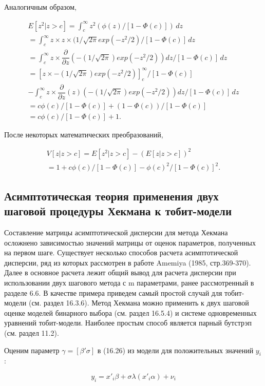 Аналогичным образом, 

\begin{multline}
E[z^2|z>c]=\int_c^{\infty}z^2(\phi(z)/[1-\Phi(c)])\,dz \\
=\int_c^{\infty} z{\times}z \times (1/\sqrt{2\pi}exp(-z^2/2)/[1-\Phi(c)]\,dz \\
=\int_c^{\infty}z{\times}\dfrac{\partial}{\partial{z}}\left(-(1/\sqrt{2\pi})exp(-z^2/2)\right)dz/[1-\Phi(c)]\,dz \\
=\left[z{\times}-(1/\sqrt{2\pi})exp(-z^2/2)\right]_c^{\infty}/[1-\Phi(c)] \\
-\int_c^{\infty}z{\times}\dfrac{\partial}{\partial{z}}(z)\left(-(1/\sqrt{2\pi})exp(-z^2/2)\right)dz/[1-\Phi(c)]\,dz\\
=c\phi(c)/[1-\Phi(c)]+(1-\Phi(c))/[1-\Phi(c)] \\
=c\phi(c)/[1-\Phi(c)]+1.
\end{multline}

После некоторых математических преобразований, 


\begin{align}
V[z|z>c]=E[z^2|z>c]-(E[z|z>c])^2 \\
=1+c\phi(c)/[1-\Phi(c)]-\phi(c)^2/[1-\Phi(c)]^{2}.
\end{align}



\subsection{Асимптотическая теория применения двух шаговой процедуры Хекмана к тобит-модели}

Составление матрицы асимптотической дисперсии для метода Хекмана осложнено зависимостью значений матрицы от оценок параметров, полученных на первом шаге. Существует несколько способов расчета асимптотической дисперсии, ряд из которых рассмотрен в работе Amemiya (1985, стр.369-370). Далее в основное расчета лежит общий вывод для расчета дисперсии при использовании двух шагового метода с m параметрами, ранее рассмотренный в разделе 6.6. В качестве примера приведем самый простой случай для тобит-модели (см. раздел 16.3.6). Метод Хекмана можно применить к двух шаговой оценке моделей бинарного выбора (см. раздел 16.5.4) и системе одновременных уравнений тобит-модели. Наиболее простым способ является парный бутстрэп (см. раздел 11.2).

Оценим параметр $\gamma=[\beta'\sigma]$ в (16.26) из модели для положительных значений $y_i$:

\[
y_i=x'_{i}\beta+\sigma\lambda(x'_{i}\alpha)+\nu_i
\]

